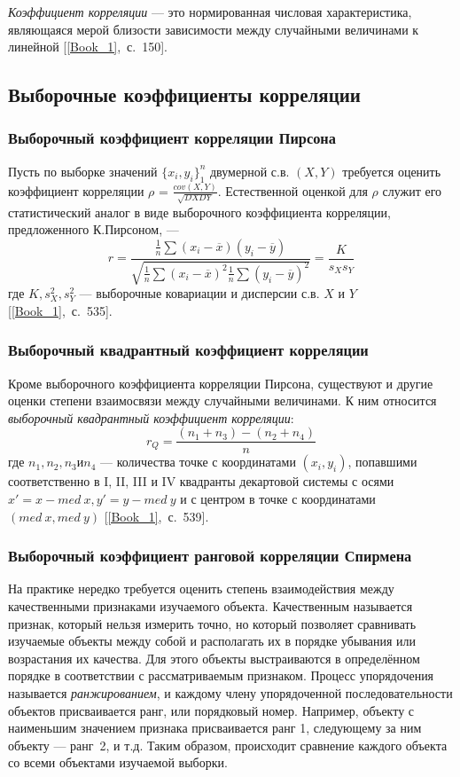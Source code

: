 \documentclass[12pt,a4paper]{article}
\begin{document}
		\emph{Коэффициент корреляции} --- это нормированная числовая характеристика, являющаяся мерой близости зависимости между случайными величинами
		к линейной [\ref{Book_1},~с.~150].
	
	\subsection{Выборочные коэффициенты корреляции}
		\subsubsection{Выборочный коэффициент корреляции Пирсона}
			Пусть по выборке значений $\{{x_i, y_i}\}^n_1$ двумерной с.в. $(X, Y)$ требуется оценить коэффициент корреляции $\rho$ = $\frac{cov(X, Y)}{\sqrt{DX DY}}$. Естественной оценкой для $\rho$ служит его статистический аналог в виде выборочного коэффициента корреляции, предложенного К.Пирсоном, ---
			\begin{equation}\label{eqn:pears}
			r = \frac{\frac{1}{n} \sum(x_i - \overline{x})(y_i - \overline{y})}{\sqrt{\frac{1}{n} \sum (x_i - \overline{x})^2 \frac{1}{n} \sum(y_i - \overline{y})^2}} = \frac{K}{s_X s_Y}
			\end{equation}
			где $K, s^2_X, s^2_Y$ --- выборочные ковариации и дисперсии с.в. $X$ и $Y$ [\ref{Book_1},~с.~535].
	
		\subsubsection{Выборочный квадрантный коэффициент корреляции}
			Кроме выборочного коэффициента корреляции Пирсона, существуют и другие оценки степени взаимосвязи между случайными величинами. К ним относится \emph{выборочный квадрантный коэффициент корреляции}:
			\begin{equation}\label{eqn:quad}
			r_Q = \frac{(n_1 + n_3) - (n_2 + n_4)}{n}
			\end{equation}
			где $n_1, n_2, n_3 и n_4$ --- количества точке с координатами $(x_i, y_i)$, попавшими
			соответственно в I, II, III и IV квадранты декартовой системы с осями $x' = x - med\:x, y' = y - med\:y$ и с центром в точке с координатами $(med\:x, med\:y)$ [\ref{Book_1},~с.~539].
		
		\subsubsection{Выборочный коэффициент ранговой корреляции Спирмена}
			На практике нередко требуется оценить степень взаимодействия между качественными признаками изучаемого объекта. Качественным называется признак, который нельзя измерить точно, но который позволяет сравнивать изучаемые объекты между собой и располагать их в порядке убывания или возрастания их качества. Для этого объекты выстраиваются в определённом порядке в соответствии с рассматриваемым признаком. Процесс упорядочения называется \emph{ранжированием}, и каждому члену упорядоченной последовательности объектов присваивается ранг, или порядковый номер. Например, объекту с наименьшим значением признака присваивается ранг 1, следующему за ним объекту --- ранг~2, и т.д. Таким образом, происходит сравнение каждого объекта со всеми объектами изучаемой выборки.
	
\end{document}
